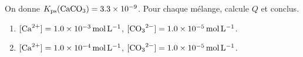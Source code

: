 \documentclass[11pt,a4paper]{article}
\begin{document}
\begin{exo}
On donne $K_{\mathrm{ps}}(\ce{CaCO3})=\num{3.3e-9}$. Pour chaque mélange, calcule $Q$ et conclus.
\begin{enumerate}[label=\alph*)]
  \item $[\ce{Ca^{2+}}]=\qty{1.0e-3}{\mole\per\litre}$, $[\ce{CO3^{2-}}]=\qty{1.0e-5}{\mole\per\litre}$.
  \item $[\ce{Ca^{2+}}]=\qty{1.0e-4}{\mole\per\litre}$, $[\ce{CO3^{2-}}]=\qty{1.0e-5}{\mole\per\litre}$.
\end{enumerate}
\end{exo}
\end{document}
